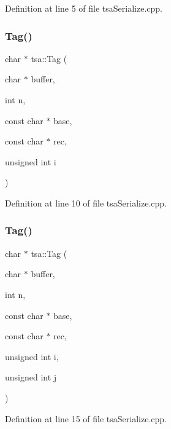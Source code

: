 Definition at line 5 of file tsa\+Serialize.\+cpp.

\mbox{\label{namespacetsa_a1079ab07e72bc3aaa35f2a9fce42cbd9}} 
\subsubsection{\texorpdfstring{Tag()}{Tag()}\hspace{0.1cm}{\footnotesize\ttfamily [2/3]}}
{\footnotesize\ttfamily char $\ast$ tsa\+::\+Tag (\begin{DoxyParamCaption}\item[{char $\ast$}]{buffer,  }\item[{int}]{n,  }\item[{const char $\ast$}]{base,  }\item[{const char $\ast$}]{rec,  }\item[{unsigned int}]{i }\end{DoxyParamCaption})}



Definition at line 10 of file tsa\+Serialize.\+cpp.

\mbox{\label{namespacetsa_a1b02aafe1625f78174f56249e0ec5d34}} 
\subsubsection{\texorpdfstring{Tag()}{Tag()}\hspace{0.1cm}{\footnotesize\ttfamily [3/3]}}
{\footnotesize\ttfamily char $\ast$ tsa\+::\+Tag (\begin{DoxyParamCaption}\item[{char $\ast$}]{buffer,  }\item[{int}]{n,  }\item[{const char $\ast$}]{base,  }\item[{const char $\ast$}]{rec,  }\item[{unsigned int}]{i,  }\item[{unsigned int}]{j }\end{DoxyParamCaption})}



Definition at line 15 of file tsa\+Serialize.\+cpp.

\mbox{\label{namespacetsa_a13bdf484592d9055ad57ffbb8f5b1b7f}} 

